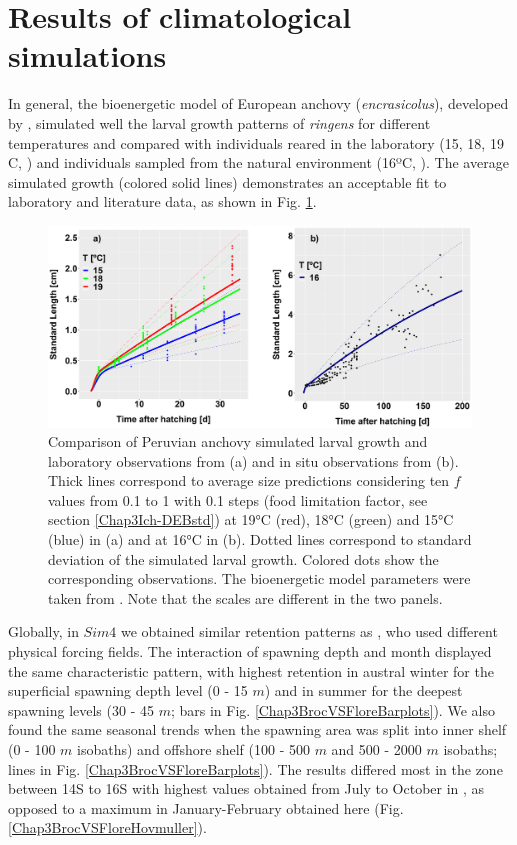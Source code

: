 \clearpage
\section{Results of climatological simulations}\label{Chap3Resu1}

In general, the bioenergetic model of European anchovy (\textit{\gls{encrasicolus}}), developed by \cite{PethRoos2013}, simulated well the larval growth patterns of \textit{\gls{ringens}} for different temperatures and compared with individuals reared in the laboratory (15, 18, 19 \textdegree C, \cite{RiouOfel2021}) and individuals sampled from the natural environment (16ºC, \cite{MoreClar2011}). The average simulated growth (colored solid lines) demonstrates an acceptable fit to laboratory and literature data, as shown in Fig. \ref{Chap3DEBvsData}.

\begin{figure}[H]
	\includegraphics[width=1.0\textwidth]{figures/Chap3DEBvsData.png}
	\centering
	\caption{Comparison of Peruvian anchovy simulated larval growth and laboratory
observations from \cite{RiouOfel2021} (a) and in situ observations from \cite{MoreClar2011}
(b). Thick lines correspond to average size predictions considering ten $f$ values from 0.1 to 1
with 0.1 steps (food limitation factor, see section \ref{Chap3Ich-DEBstd}) at 19°C (red), 18°C (green) and 15°C (blue) in (a) and at 16°C in (b). Dotted lines correspond to standard deviation of the simulated larval growth. Colored dots show the corresponding observations. The bioenergetic model
parameters were taken from \cite{PethRoos2013}. Note that the scales are different in the
two panels.}
	\label{Chap3DEBvsData}
\end{figure}

Globally, in $Sim 4$ we obtained similar retention patterns as \cite{BrocLett2008}, who used different physical forcing fields. The interaction of spawning depth and month displayed the same characteristic pattern, with highest retention in austral winter for the superficial spawning depth level (0 - 15 $m$) and in summer for the deepest spawning levels (30 - 45 $m$; bars in Fig. \ref{Chap3BrocVSFloreBarplots}). We also found the same seasonal trends when the spawning area was split into inner shelf (0 - 100 $m$ isobaths) and offshore shelf (100 - 500 $m$ and 500 - 2000 $m$ isobaths; lines in Fig. \ref{Chap3BrocVSFloreBarplots}). The results differed most in the zone between 14\textdegree S to 16\textdegree S with highest values obtained from July to October in \cite{BrocLett2008}, as opposed to a maximum in January-February obtained here (Fig. \ref{Chap3BrocVSFloreHovmuller}).\\

